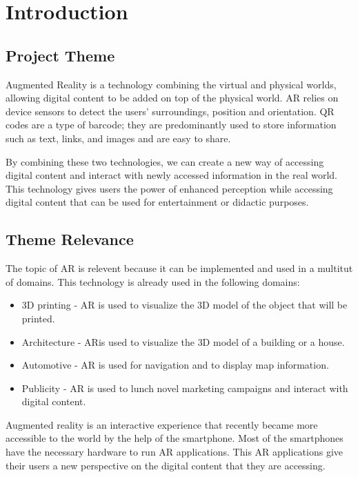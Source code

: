 \chapter{Introduction}\label{cap:introduction}

\section{Project Theme}
Augmented Reality is a technology combining the virtual and physical worlds, allowing digital content to be added on top of the physical world.
\ac{AR} relies on device sensors to detect the users' surroundings, position and orientation. \ac{QR} codes are a type of barcode; they are predominantly used to store information such as text, links, and images and are easy to share.

By combining these two technologies, we can create a new way of accessing digital content and interact with newly accessed information in the real world. This technology gives users the power of enhanced perception while accessing digital content that can be used for entertainment or didactic purposes.


\section{Theme Relevance}
The topic of \ac{AR} is relevent because it can be implemented and used in a multitut of domains. This technology is already used in the following domains:
\begin{itemize}
    \item \ac{3D} printing - \ac{AR} is used to visualize the \ac{3D} model of the object that will be printed.
    \item Architecture - \ac{AR}is used to visualize the \ac{3D} model of a building or a house.
    \item Automotive - \ac{AR} is used for navigation and to display map information.
    \item Publicity - \ac{AR} is used to lunch novel marketing campaigns and interact with digital content.
\end{itemize}


Augmented reality is an interactive experience that recently became more accessible to the world by the help of the smartphone. Most of the smartphones have the necessary hardware to run \ac{AR} applications. This \ac{AR} applications give their users a new perspective on the digital content that they are accessing.
\pagebreak

